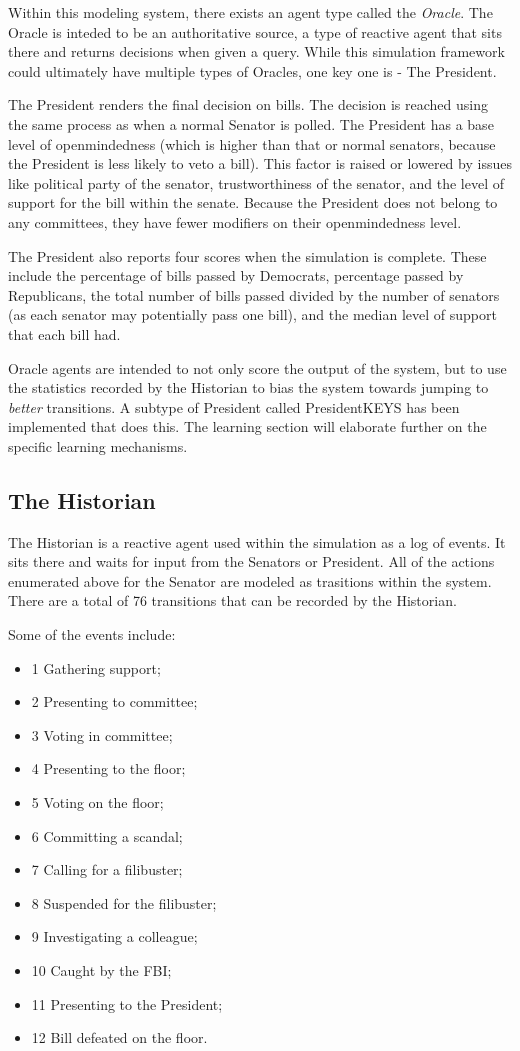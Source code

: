 \documentclass{sig-alternate}
\newenvironment{smallitem}
 {\setlength{\topsep}{0pt}
  \setlength{\partopsep}{0pt}
  \setlength{\parskip}{0pt}
  \begin{itemize}
   \setlength{\leftmargin}{.2in}
  \setlength{\parsep}{0pt}
  \setlength{\parskip}{0pt}
  \setlength{\itemsep}{0pt}}
 {\end{itemize}}
\newcommand{\bi}{\begin{smallitem}}
\newcommand{\ei}{\end{smallitem}}
\begin{document}
Within this modeling system, there exists an agent type called the {\em Oracle}. The Oracle is inteded to be an authoritative source, a type 
of reactive agent that sits there and returns decisions when given
a query. While this simulation framework could ultimately have 
multiple types of 
Oracles, one key one is - The President.

The President renders the final decision on bills. The decision is
reached using the same process as when a normal Senator is polled. The
President has a base level of openmindedness (which is higher than
that or normal senators, because the President is less likely to veto
a bill). This factor is raised or lowered by issues like political party of the senator,
trustworthiness of the senator, and the level of support for the bill
within the senate. Because the President does not belong to any committees, 
they have fewer modifiers on their openmindedness level. 

The President also reports four scores when the simulation is complete.
These include the percentage of bills passed by Democrats, percentage passed by Republicans,
the total number of bills passed divided by the number of senators (as
each senator may potentially pass one bill), and the median level of support that each bill had.

Oracle agents are intended to not only score the output of the system, 
but to use the statistics recorded by the Historian to bias the system
towards jumping to {\em better} transitions. 
A subtype of President called PresidentKEYS has been implemented that
does this. The learning section will elaborate further on the specific 
learning mechanisms.

\subsection{The Historian}
\label{sec:historian}

The Historian is a reactive agent used within the simulation as a log of events. It sits there and waits for input from the Senators or President.
All of the actions enumerated above for the Senator are modeled as trasitions within the system. 
There are a total of 76 transitions that can be recorded by the Historian.  

Some of the events include:
\bi
\item [1] Gathering support;
\item [2] Presenting to committee;
\item [3] Voting in committee;
\item [4] Presenting to the floor;
\item [5] Voting on the floor;
\item [6] Committing a scandal;
\item [7] Calling for a filibuster;
\item [8] Suspended for the filibuster;
\item [9] Investigating a colleague;
\item [10] Caught by the FBI;
\item [11] Presenting to the President;
\item [12] Bill defeated on the floor.
\ei
\end{document}
